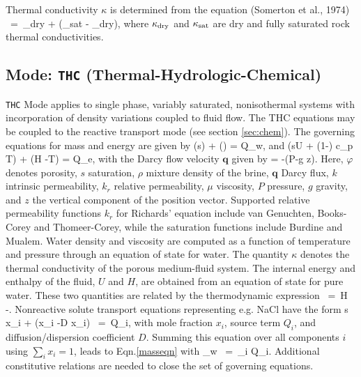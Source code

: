 \documentclass[12pt]{article}
\def\EQ#1\EN{\begin{equation}#1\end{equation}}
\newcommand{\eq}{\ =\ }
\newcommand{\p}{{\partial}}
\newcommand{\bnabla}{\boldsymbol{\nabla}}
\newcommand{\bq}{\boldsymbol{q}}
\begin{document}
 
Thermal conductivity $\kappa$ is determined from the equation (Somerton et 
al., 1974)  
\EQ\label{cond} 
\kappa \eq \kappa_{\rm dry} +  (\kappa_{\rm sat} - \kappa_{\rm dry}), 
\EN 
where $\kappa_{\rm dry}$ and $\kappa_{\rm sat}$ are dry and fully saturated rock thermal conductivities. 


\subsection{Mode: {\tt THC} (Thermal-Hydrologic-Chemical)}

{\tt THC} Mode applies to single phase, variably saturated, nonisothermal systems
with incorporation of density variations coupled to fluid flow. The THC equations may be coupled to the reactive transport mode (see section \ref{sec:chem}).
The governing equations for mass and energy are given by
\EQ\label{masseqn}
\frac{\p}{\p t}\left(\varphi s\rho\right) + \bnabla\cdot\left(\rho\bq\right) = Q_w,
\EN
and
\EQ
\frac{\p}{\p t}\left(\varphi s\rho U + (1-\varphi) c_p T\right) + \bnabla\cdot\left(\rho\bq H -\kappa \bnabla T\right) = Q_e,
\EN
with the Darcy flow velocity $\bq$ given by
\EQ
\bq = -\bnabla\left(P-\rho g z\right).
\EN
Here, $\varphi$ denotes porosity, $s$ saturation, $\rho$ mixture density of the brine, $\bq$ Darcy flux, $k$ intrinsic permeability, $k_r$ relative permeability, $\mu$ viscosity, $P$ pressure, $g$ gravity, and $z$ the vertical component of the position vector.  Supported relative permeability functions $k_r$ for Richards' equation include van Genuchten, Books-Corey and Thomeer-Corey, while the saturation functions include Burdine and Mualem.  Water density and viscosity are computed as a function of temperature and pressure through an equation of state for water. The quantity $\kappa$ denotes the thermal conductivity of the porous medium-fluid system. The internal energy and enthalpy of the fluid, $U$ and $H$, are obtained from an equation of state for pure water. These two quantities are related by the thermodynamic expression
\EQ
U \eq H -.
\EN
Nonreactive solute transport equations representing e.g. NaCl have the form
\EQ
\frac{\p}{\p t} \varphi s \rho x_i + \bnabla\cdot\Big(\bq \rho x_i -\varphi D \rho\bnabla x_i\Big) \eq Q_i,
\EN
with mole fraction $x_i$, source term $Q_i$, and diffusion/dispersion coefficient $D$. Summing this equation over all components $i$ using $\sum_ix_i=1$, leads to Eqn.\eqref{masseqn} with
\EQ
Q_w \eq \sum_i Q_i.
\EN
Additional constitutive relations are needed to close the set of governing equations.
\end{document}
